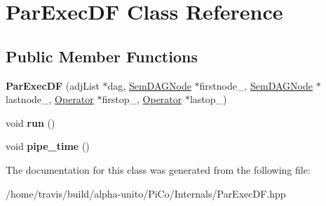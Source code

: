 \hypertarget{class_par_exec_d_f}{\section{\-Par\-Exec\-D\-F \-Class \-Reference}
\label{class_par_exec_d_f}
}
\subsection*{\-Public \-Member \-Functions}
\begin{DoxyCompactItemize}
\item 
\hypertarget{class_par_exec_d_f_aef7a4078b19e981b0f6d0654509e2f24}{{\bfseries \-Par\-Exec\-D\-F} (adj\-List $\ast$dag, \hyperlink{class_sem_d_a_g_node}{\-Sem\-D\-A\-G\-Node} $\ast$firstnode\-\_\-, \hyperlink{class_sem_d_a_g_node}{\-Sem\-D\-A\-G\-Node} $\ast$lastnode\-\_\-, \hyperlink{class_operator}{\-Operator} $\ast$firstop\-\_\-, \hyperlink{class_operator}{\-Operator} $\ast$lastop\-\_\-)}\label{class_par_exec_d_f_aef7a4078b19e981b0f6d0654509e2f24}

\item 
\hypertarget{class_par_exec_d_f_a5afb1f6732c4c84461a938b7d13fdf49}{void {\bfseries run} ()}\label{class_par_exec_d_f_a5afb1f6732c4c84461a938b7d13fdf49}

\item 
\hypertarget{class_par_exec_d_f_a4a159b5d038d9ff492dddf3ef5881052}{void {\bfseries pipe\-\_\-time} ()}\label{class_par_exec_d_f_a4a159b5d038d9ff492dddf3ef5881052}

\end{DoxyCompactItemize}


\-The documentation for this class was generated from the following file\-:\begin{DoxyCompactItemize}
\item 
/home/travis/build/alpha-\/unito/\-Pi\-Co/\-Internals/\-Par\-Exec\-D\-F.\-hpp\end{DoxyCompactItemize}
